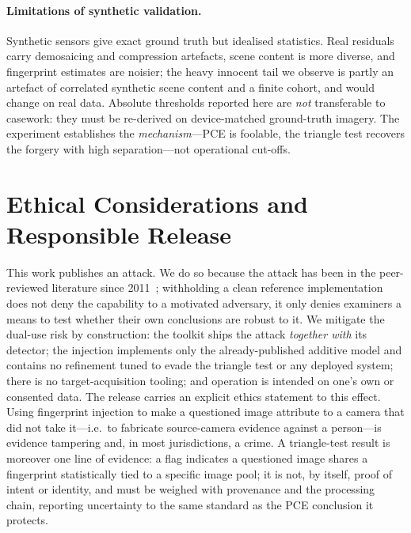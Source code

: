 \documentclass[11pt]{article}
\begin{document}
\paragraph{Limitations of synthetic validation.}
Synthetic sensors give exact ground truth but idealised statistics. Real
residuals carry demosaicing and compression artefacts, scene content is more
diverse, and fingerprint estimates are noisier; the heavy innocent tail we
observe is partly an artefact of correlated synthetic scene content and a finite
cohort, and would change on real data. Absolute thresholds reported here are
\emph{not} transferable to casework: they must be re-derived on device-matched
ground-truth imagery. The experiment establishes the \emph{mechanism}---PCE is
foolable, the triangle test recovers the forgery with high separation---not
operational cut-offs.

\section{Ethical Considerations and Responsible Release}
\label{sec:ethics}
This work publishes an attack. We do so because the attack has been in the
peer-reviewed literature since 2011~\cite{goljan2011}; withholding a clean
reference implementation does not deny the capability to a motivated adversary,
it only denies examiners a means to test whether their own conclusions are robust
to it. We mitigate the dual-use risk by construction: the toolkit ships the
attack \emph{together with} its detector; the injection implements only the
already-published additive model and contains no refinement tuned to evade the
triangle test or any deployed system; there is no target-acquisition tooling; and
operation is intended on one's own or consented data. The release carries an
explicit ethics statement to this effect. Using fingerprint injection to make a
questioned image attribute to a camera that did not take it---i.e.\ to fabricate
source-camera evidence against a person---is evidence tampering and, in most
jurisdictions, a crime. A triangle-test result is moreover one line of evidence:
a flag indicates a questioned image shares a fingerprint statistically tied to a
specific image pool; it is not, by itself, proof of intent or identity, and must
be weighed with provenance and the processing chain, reporting uncertainty to the
same standard as the PCE conclusion it protects.
\end{document}
